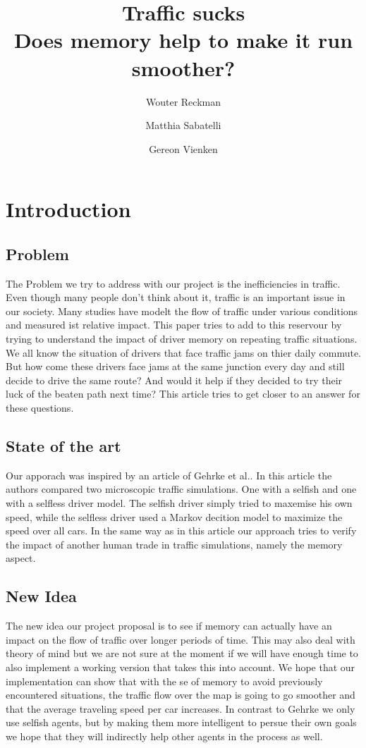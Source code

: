 \documentclass{article}
\title{\textbf{\huge Traffic sucks\\ Does memory help to make it run smoother?}}
\author{Wouter Reckman \affila \and
    Matthia Sabatelli \affilb \and
    Gereon Vienken \affila}
\begin{document}
\ttl
\thispagestyle{empty}


\begin{abstract}

\end{abstract}


\section{Introduction}

\subsection{Problem}
The Problem we try to address with our project is the inefficiencies in traffic. Even though many people don't think about it, traffic is an important issue in our society. Many studies have modelt the flow of traffic under various conditions and measured ist relative impact. This paper tries to add to this reservour by trying to understand the impact of driver memory on repeating traffic situations. We all know the situation of drivers that face traffic jams on thier daily commute. But how come these drivers face jams at the same junction every day and still decide to drive the same route? And would it help if they decided to try their luck of the beaten path next time? This article tries to get closer to an answer for these questions. 

\subsection{State of the art}
Our apporach was inspired by an article of Gehrke et al.\cite{gehrke2008traffic}. In this article the authors compared two microscopic traffic simulations. One with a selfish and one with a selfless driver model. The selfish driver simply tried to maxemise his own speed, while the selfless driver used a Markov decition model to maximize the speed over all cars. In the same way as in this article our approach tries to verify the impact of another human trade in traffic simulations, namely the memory aspect.  

\subsection{New Idea}
The new idea our project proposal is to see if memory can actually have an impact on the flow of traffic over longer periods of time. This may also deal with theory of mind but we are not sure at the moment if we will have enough time to also implement a working version that takes this into account. We hope that our implementation can show that with the se of memory to avoid previously encountered situations, the traffic flow over the map is going to go smoother and that the average traveling speed per car increases. In contrast to Gehrke we only use selfish agents, but by making them more intelligent to persue their own goals we hope that they will indirectly help other agents in the process as well.
\end{document}
